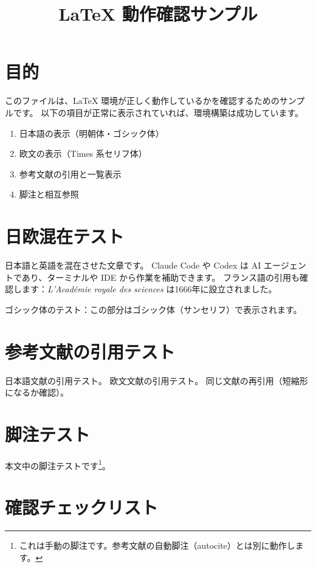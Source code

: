 \documentclass[a4paper,11pt,oneside]{jlreq}
\title{LaTeX 動作確認サンプル}
\author{}
\date{}
\begin{document}
\maketitle

\section{目的}

このファイルは、LaTeX 環境が正しく動作しているかを確認するためのサンプルです。
以下の項目が正常に表示されていれば、環境構築は成功しています。

\begin{enumerate}
  \item 日本語の表示（明朝体・ゴシック体）
  \item 欧文の表示（Times 系セリフ体）
  \item 参考文献の引用と一覧表示
  \item 脚注と相互参照
\end{enumerate}

\section{日欧混在テスト}

日本語と英語を混在させた文章です。
Claude Code や Codex は AI エージェントであり、ターミナルや IDE から作業を補助できます。
フランス語の引用も確認します：\textit{L'Académie royale des sciences} は1666年に設立されました。

ゴシック体のテスト：{\sffamily この部分はゴシック体（サンセリフ）で表示されます。}

\section{参考文献の引用テスト}


日本語文献の引用テスト\autocite[10--15]{yamada2020}。
欧文文献の引用テスト\autocite[42]{smith2019}。
同じ文献の再引用（短縮形になるか確認）\autocite[20]{yamada2020}。

\section{脚注テスト}

本文中の脚注テストです\footnote{これは手動の脚注です。参考文献の自動脚注（autocite）とは別に動作します。}。

\section{確認チェックリスト}
\end{document}
